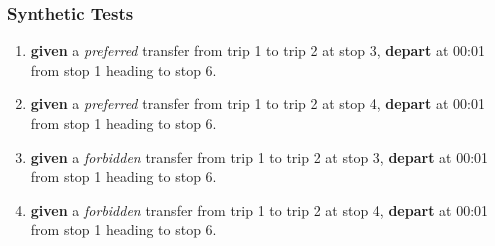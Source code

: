 \documentclass[a4paper,11pt]{article}
\begin{document}
\begin{enumerate}
\subsubsection*{Synthetic Tests}
\begin{enumerate}
\item \textbf{given} a \textit{preferred} transfer from trip 1 to trip 2 at stop 3, \textbf{depart} at 00:01 from stop 1 heading to stop 6.
\item \textbf{given} a \textit{preferred} transfer from trip 1 to trip 2 at stop 4, \textbf{depart} at 00:01 from stop 1 heading to stop 6.
\item \textbf{given} a \textit{forbidden} transfer from trip 1 to trip 2 at stop 3, \textbf{depart} at 00:01 from stop 1 heading to stop 6.
\item \textbf{given} a \textit{forbidden} transfer from trip 1 to trip 2 at stop 4, \textbf{depart} at 00:01 from stop 1 heading to stop 6.
\end{enumerate}


\end{enumerate}
\end{document}
